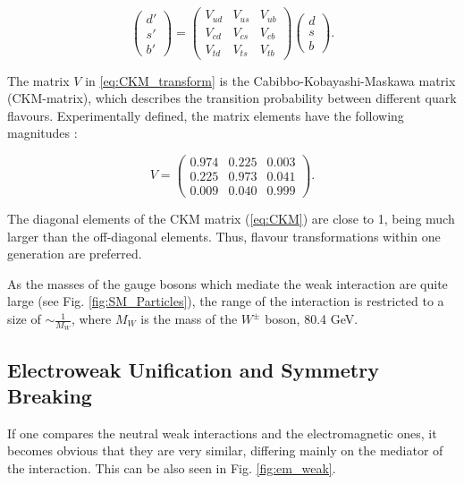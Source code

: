 \begin{equation} \label{eq:CKM_transform}
\left( \begin{array}{c} d' \\ s' \\ b' \end{array} \right) = 
\left( \begin{array}{ccc} V_{ud} & V_{us} & V_{ub} \\ V_{cd} & V_{cs} & V_{cb} \\ V_{td} & V_{ts} & V_{tb} \end{array} \right)
\left( \begin{array}{c} d \\ s \\ b\end{array} \right).
\end{equation}

The matrix $V$ in \ref{eq:CKM_transform} is the Cabibbo-Kobayashi-Maskawa matrix (CKM-matrix)\cite{Kobayashi:1973fv}, which describes the transition probability 
between different quark flavours. Experimentally defined, the matrix elements have the following magnitudes \cite{PDG-2012}:

\begin{equation} \label{eq:CKM}
 V = \left( \begin{array}{ccc} 0.974 & 0.225 & 0.003 \\ 0.225 & 0.973 & 0.041 \\ 0.009 & 0.040 & 0.999 \end{array} \right).
\end{equation}

The diagonal elements of the CKM matrix (\ref{eq:CKM}) are close to 1, being much larger than the off-diagonal elements. Thus, flavour transformations
within one generation are preferred.

As the masses of the gauge bosons which mediate the weak interaction are quite large (see Fig. \ref{fig:SM_Particles}), the range of the interaction is restricted
to a size of $\sim \frac{1}{M_{W}}$, where $M_{W}$ is the mass of the $W^{\pm}$ boson, 80.4 GeV.

\subsection{Electroweak Unification and Symmetry Breaking}

If one compares the neutral weak interactions and the electromagnetic ones, it becomes obvious that they are very similar, differing mainly on the mediator
of the interaction. This can be also seen in Fig. \ref{fig:em_weak}.

